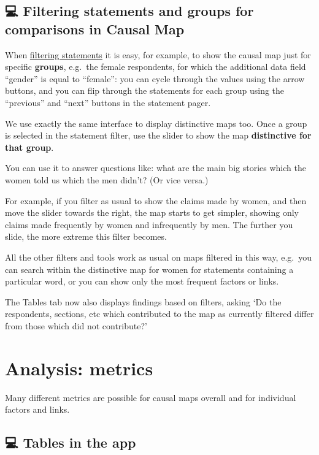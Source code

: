 \documentclass[
]{book}
\begin{document}
\hypertarget{filtering-statements-and-groups-for-comparisons-in-causal-map}{%
\section{💻 Filtering statements and groups for comparisons in Causal Map}\label{filtering-statements-and-groups-for-comparisons-in-causal-map}}

When \protect\hyperlink{filtering-the-map-by-statement-source-question}{filtering statements} it is easy, for example, to show the causal map just for specific \textbf{groups}, e.g.~the female respondents, for which the additional data field ``gender'' is equal to ``female'': you can cycle through the values using the arrow buttons, and you can flip through the statements for each group using the ``previous'' and ``next'' buttons in the statement pager.

We use exactly the same interface to display distinctive maps too. Once a group is selected in the statement filter, use the slider to show the map \textbf{distinctive for that group}.

You can use it to answer questions like: what are the main big stories which the women told us which the men didn't? (Or vice versa.)

For example, if you filter as usual to show the claims made by women, and then move the slider towards the right, the map starts to get simpler, showing only claims made frequently by women and infrequently by men. The further you slide, the more extreme this filter becomes.

All the other filters and tools work as usual on maps filtered in this way, e.g.~you can search within the distinctive map for women for statements containing a particular word, or you can show only the most frequent factors or links.

The Tables tab now also displays findings based on filters, asking `Do the respondents, sections, etc which contributed to the map as currently filtered differ from those which did not contribute?'

\hypertarget{analysis-metrics}{%
\chapter{Analysis: metrics}\label{analysis-metrics}}

Many different metrics are possible for causal maps overall and for individual factors and links.

\hypertarget{tables-in-the-app}{%
\section{💻 Tables in the app}\label{tables-in-the-app}}
\end{document}

